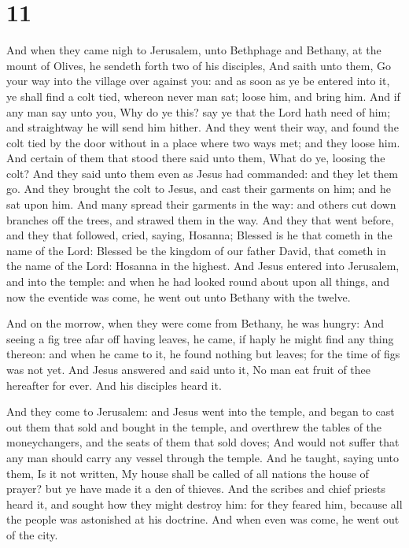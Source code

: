 \hypertarget{section-10}{%
\section{11}\label{section-10}}

 And when they came nigh to Jerusalem, unto Bethphage and
Bethany, at the mount of Olives, he sendeth forth two of his disciples,
 And saith unto them, Go your way into the village over
against you: and as soon as ye be entered into it, ye shall find a colt
tied, whereon never man sat; loose him, and bring him. 
And if any man say unto you, Why do ye this? say ye that the Lord hath
need of him; and straightway he will send him hither.  And
they went their way, and found the colt tied by the door without in a
place where two ways met; and they loose him.  And certain
of them that stood there said unto them, What do ye, loosing the colt?
 And they said unto them even as Jesus had commanded: and
they let them go.  And they brought the colt to Jesus, and
cast their garments on him; and he sat upon him.  And many
spread their garments in the way: and others cut down branches off the
trees, and strawed them in the way.  And they that went
before, and they that followed, cried, saying, Hosanna; Blessed is he
that cometh in the name of the Lord:  Blessed be the
kingdom of our father David, that cometh in the name of the Lord:
Hosanna in the highest.  And Jesus entered into
Jerusalem, and into the temple: and when he had looked round about upon
all things, and now the eventide was come, he went out unto Bethany with
the twelve.

 And on the morrow, when they were come from Bethany, he
was hungry:  And seeing a fig tree afar off having
leaves, he came, if haply he might find any thing thereon: and when he
came to it, he found nothing but leaves; for the time of figs was not
yet.  And Jesus answered and said unto it, No man eat
fruit of thee hereafter for ever. And his disciples heard it.

 And they come to Jerusalem: and Jesus went into the
temple, and began to cast out them that sold and bought in the temple,
and overthrew the tables of the moneychangers, and the seats of them
that sold doves;  And would not suffer that any man
should carry any vessel through the temple.  And he
taught, saying unto them, Is it not written, My house shall be called of
all nations the house of prayer? but ye have made it a den of thieves.
 And the scribes and chief priests heard it, and sought
how they might destroy him: for they feared him, because all the people
was astonished at his doctrine.  And when even was come,
he went out of the city.

